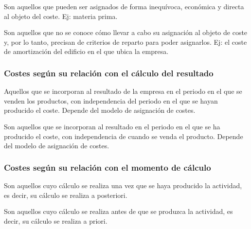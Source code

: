 \documentclass[12pt]{report} %
\begin{document}
\begin{definicion}
Son aquellos que pueden ser asignados de forma inequívoca, económica y directa al objeto del coste. Ej: materia prima.
\end{definicion}

\begin{definicion}
Son aquellos que no se conoce cómo llevar a cabo su asignación al objeto de coste y, por lo tanto, precisan de criterios de reparto para poder asignarlos. Ej: el coste de amortización del edificio en el que ubica la empresa.
\end{definicion}

\hypertarget{costes-seguxfan-su-relaciuxf3n-con-el-cuxe1lculo-del-resultado}{%
\subsubsection{Costes según su relación con el cálculo del
resultado}\label{costes-seguxfan-su-relaciuxf3n-con-el-cuxe1lculo-del-resultado}}

\begin{definicion}
Aquellos que se incorporan al resultado de la empresa en el periodo en el que se venden los productos, con independencia del periodo en el que se hayan producido el coste. Depende del modelo de asignación de costes.
\end{definicion}

\begin{definicion}
Son aquellos que se incorporan al resultado en el periodo en el que se ha producido el coste, con independencia de cuando se venda el producto. Depende del modelo de asignación de costes.
\end{definicion}

\hypertarget{costes-seguxfan-su-relaciuxf3n-con-el-momento-de-cuxe1lculo}{%
\subsubsection{Costes según su relación con el momento de
cálculo}\label{costes-seguxfan-su-relaciuxf3n-con-el-momento-de-cuxe1lculo}}

\begin{definicion}
Son aquellos cuyo cálculo se realiza una vez que se haya producido la actividad, es decir, su cálculo se realiza a posteriori.
\end{definicion}

\begin{definicion}
Son aquellos cuyo cálculo se realiza antes de que se produzca la actividad, es decir, su cálculo se realiza a priori.
\end{definicion}
\end{document}
